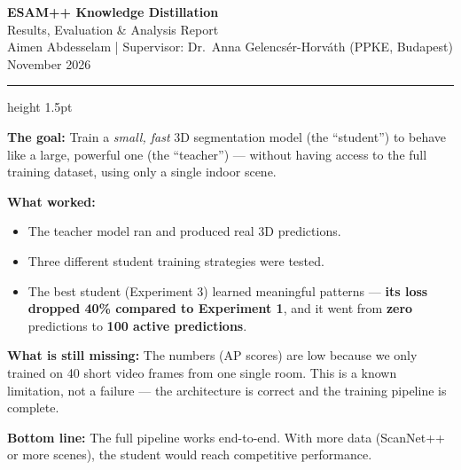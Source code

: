\documentclass[12pt,a4paper]{article}
\newcommand{\good}[1]{\textbf{\textcolor{accentgreen}{#1}}}
\newcommand{\bad}[1]{\textbf{\textcolor{alertred}{#1}}}
\begin{document}
\begin{center}
  {\Huge\bfseries\color{mainblue} ESAM++ Knowledge Distillation}\\[6pt]
  {\LARGE Results, Evaluation \& Analysis Report}\\[8pt]
  {\large\color{darkgray}
    Aimen Abdesselam \quad|\quad
    Supervisor: Dr.\ Anna Gelencsér-Horváth (PPKE, Budapest)\\
    November 2026}
\end{center}

\vspace{4pt}
\hrule height 1.5pt
\vspace{10pt}

\begin{tcolorbox}[
  colback=lightblue, colframe=mainblue,
  fonttitle=\bfseries\Large, title={What This Project Is About (Plain Language)},
  arc=5pt, boxrule=1.5pt, left=10pt, right=10pt, top=8pt, bottom=8pt
]
\textbf{The goal:} Train a \textit{small, fast} 3D segmentation model (the ``student'')
to behave like a large, powerful one (the ``teacher'') --- without having access to the
full training dataset, using only a single indoor scene.

\medskip
\textbf{What worked:}
\begin{itemize}[noitemsep]
  \item The teacher model ran and produced real 3D predictions.
  \item Three different student training strategies were tested.
  \item The best student (Experiment 3) learned meaningful patterns —
        \textbf{its loss dropped 40\% compared to Experiment 1},
        and it went from \bad{zero} predictions to \good{100 active predictions}.
\end{itemize}

\medskip
\textbf{What is still missing:} The numbers (AP scores) are low because we only
trained on 40 short video frames from one single room. This is a known limitation, not
a failure — the architecture is correct and the training pipeline is complete.

\medskip
\textbf{Bottom line:} The full pipeline works end-to-end. With more data
(ScanNet++ or more scenes), the student would reach competitive performance.
\end{tcolorbox}
\end{document}
